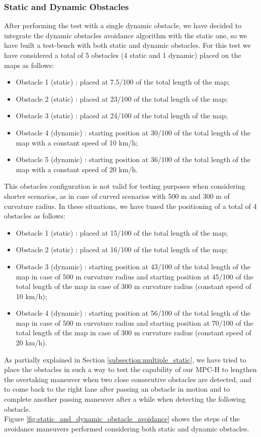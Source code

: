 \subsubsection{Static and Dynamic Obstacles} 

After performing the test with a single dynamic obstacle, we have decided to integrate the dynamic obstacles avoidance algorithm with the static one, so we have built a test-bench with both static and dynamic obstacles. For this test we have considered a total of 5 obstacles (4 static and 1 dynamic) placed on the maps as follows:
\begin{itemize}
    \item Obstacle 1 (static) : placed at 7.5/100 of the total length of the map;
    \item Obstacle 2 (static) : placed at 23/100 of the total length of the map;
    \item Obstacle 3 (static) : placed at 24/100 of the total length of the map;
    \item Obstacle 4 (dynamic) : starting position at 30/100 of the total length of the map with a constant speed of 10 km/h;
    \item Obstacle 5 (dynamic) : starting position at 36/100 of the total length of the map with a constant speed of 20 km/h.
\end{itemize}

This obstacles configuration is not valid for testing purposes when considering shorter scenarios, as in case of curved scenarios with 500 m and 300 m of curvature radius. In these situations, we have tuned the positioning of a total of 4 obstacles as follows:
\begin{itemize}
    \item Obstacle 1 (static) : placed at 15/100 of the total length of the map;
    \item Obstacle 2 (static) : placed at 16/100 of the total length of the map;
    \item Obstacle 3 (dynamic) : starting position at 43/100 of the total length of the map in case of 500 m curvature radius and starting position at 45/100 of the total length of the map in case of 300 m curvature radius (constant speed of 10 km/h);
    \item Obstacle 4 (dynamic) : starting position at 56/100 of the total length of the map in case of 500 m curvature radius and starting position at 70/100 of the total length of the map in case of 300 m curvature radius (constant speed of 20 km/h).
\end{itemize}
As partially explained in Section \ref{subsection:multiple_static}, we have tried to place the obstacles in such a way to test the capability of our MPC-H to lengthen the overtaking maneuver when two close consecutive obstacles are detected, and to come back to the right lane after passing an obstacle in motion and to complete another passing maneuver after a while when detecting the following obstacle. 
\\Figure \ref{fig:static_and_dynamic_obstacle_avoidance} shows the steps of the avoidance maneuvers performed considering both static and dynamic obstacles.


